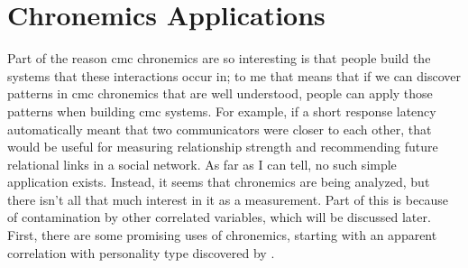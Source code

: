 \documentclass[
  stu]{apa7}
\begin{document}
\hypertarget{chronemics-applications}{%
\section{Chronemics Applications}\label{chronemics-applications}}

Part of the reason cmc chronemics are so interesting is that people
build the systems that these interactions occur in; to me that means
that if we can discover patterns in cmc chronemics that are well
understood, people can apply those patterns when building cmc systems.
For example, if a short response latency automatically meant that two
communicators were closer to each other, that would be useful for
measuring relationship strength and recommending future relational links
in a social network. As far as I can tell, no such simple application
exists. Instead, it seems that chronemics are being analyzed, but there
isn't all that much interest in it as a measurement. Part of this is
because of contamination by other correlated variables, which will be
discussed later. First, there are some promising uses of chronemics,
starting with an apparent correlation with personality type discovered
by \textcite{kalman13}.

\printbibliography[title=Conclusion]
\end{document}
